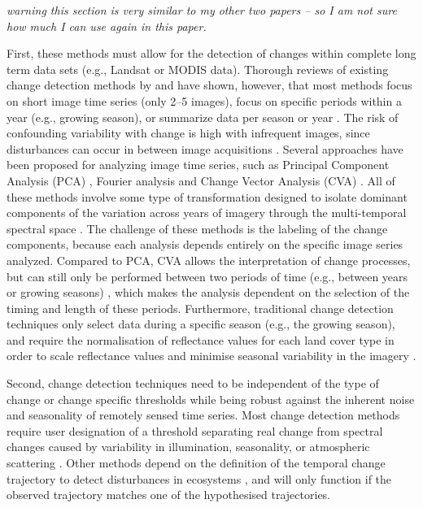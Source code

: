 \documentclass[authoryear,preprint,review,10pt]{elsarticle}
\begin{document}
\emph{warning this section is very similar to my other two papers -- so I am not sure
how much I can use again in this paper.}

First, these methods must allow for the detection of changes within complete
long term data sets (e.g., Landsat or MODIS data). Thorough reviews of existing
change detection methods by \citet{Coppin2004} and \citet{Lu2004} have shown,
however, that most methods focus on short image time series (only 2--5 images),
focus on specific periods within a year (e.g., growing season), or summarize
data per season or year \citep{Bontemps2008,Fensholt2009,Hilker2009}. The risk
of confounding variability with change is high with infrequent images, since
disturbances can occur in between image acquisitions \citep{Beurs2005}. Several
approaches have been proposed for analyzing image time series, such as Principal
Component Analysis (PCA) \citep{Crist1984}, Fourier analysis and Change Vector
Analysis (CVA) \citep{Lambin1994}. All of these methods involve some type of
transformation designed to isolate dominant components of the variation across
years of imagery through the multi-temporal spectral space
\citep{Crist1984,Lhermitte2008,Lambin1994,Jakubauskas2001,Deng2008}. The
challenge of these methods is the labeling of the change components, because
each analysis depends entirely on the specific image series analyzed. Compared
to PCA, CVA allows the interpretation of change processes, but can still only be
performed between two periods of time (e.g., between years or growing seasons)
\citep{Lambin1994}, which makes the analysis dependent on the selection of the
timing and length of these periods. Furthermore, traditional change detection
techniques only select data during a specific season (e.g., the growing season),
and require the normalisation of reflectance values for each land cover type in
order to scale reflectance values and minimise seasonal variability in the
imagery \citep{Healey2005,Hilker2009}.

Second, change detection techniques need to be independent of the type of change
or change specific thresholds while being robust against the inherent noise and
seasonality of remotely sensed time series. Most change detection methods
require user designation of a threshold separating real change from spectral
changes caused by variability in illumination, seasonality, or atmospheric
scattering \citep{Lu2004}. Other methods depend on the definition of the
temporal change trajectory to detect disturbances in ecosystems
\citep{Hayes2007,Kennedy2007}, and will only function if the observed trajectory
matches one of the hypothesised trajectories.
\end{document}
